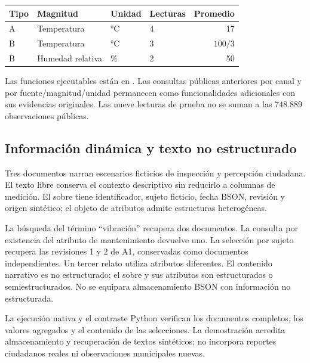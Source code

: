 \begin{center}
\begin{tabular}{llllr}
\toprule Tipo & Magnitud & Unidad & Lecturas & Promedio \\
\midrule
A & Temperatura & °C & 4 & 17 \\
B & Temperatura & °C & 3 & $100/3$ \\
B & Humedad relativa & \% & 2 & 50 \\
\bottomrule
\end{tabular}
\end{center}

Las funciones ejecutables están en
. Las consultas públicas
anteriores por canal y por fuente/magnitud/unidad permanecen como funcionalidades
adicionales con sus evidencias originales. Las nueve lecturas de prueba no se
suman a las 748.889 observaciones públicas.

\subsection{Información dinámica y texto no estructurado}
Tres documentos narran escenarios ficticios de inspección y percepción ciudadana.
El texto libre conserva el contexto descriptivo sin reducirlo a columnas de
medición. El sobre tiene identificador, sujeto ficticio, fecha BSON, revisión y
origen sintético; el objeto de atributos admite estructuras heterogéneas.

La búsqueda del término ``vibración'' recupera dos documentos. La consulta por
existencia del atributo de mantenimiento devuelve uno. La selección por sujeto
recupera las revisiones 1 y 2 de A1, conservadas como documentos independientes.
Un tercer relato utiliza atributos diferentes. El contenido narrativo es no
estructurado; el sobre y sus atributos son estructurados o semiestructurados.
No se equipara almacenamiento BSON con información no estructurada.

La ejecución nativa y el contraste Python verifican los documentos completos,
los valores agregados y el contenido de las selecciones. La demostración acredita
almacenamiento y recuperación de textos sintéticos; no incorpora reportes
ciudadanos reales ni observaciones municipales nuevas.
